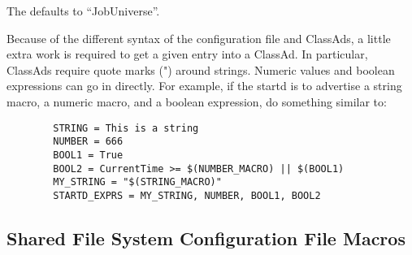 \begin{description}
  The   defaults to
  ``JobUniverse''.

  Because of the different syntax of the configuration
  file and ClassAds, a little extra work is required to get a
  given entry into a ClassAd.  In particular, ClassAds require quote
  marks (") around strings.  Numeric values and boolean expressions
  can go in directly.  
  For example, if the startd is to advertise a string macro, a numeric
  macro, and a boolean expression, do something similar to:

\begin{verbatim}
        STRING = This is a string 
        NUMBER = 666
        BOOL1 = True
        BOOL2 = CurrentTime >= $(NUMBER_MACRO) || $(BOOL1)
        MY_STRING = "$(STRING_MACRO)"
        STARTD_EXPRS = MY_STRING, NUMBER, BOOL1, BOOL2
\end{verbatim}

\end{description}

\subsection{\label{sec:Shared-Filesystem-Config-File-Entries}
Shared File System Configuration File Macros}

